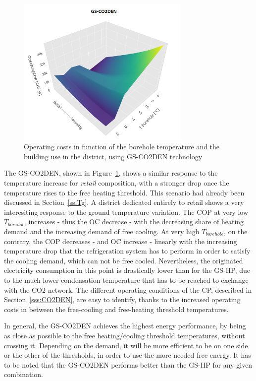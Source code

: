 \documentclass{article}
\begin{document}
\begin{figure}[htp]
	\centering
	\includegraphics[width=0.75\textwidth]{CUTg_SA_CO2_OC.png}
	\caption{Operating costs in function of the borehole temperature and the building use in the district, using GS-CO2DEN technology}
	\label{fig:CUTg_CO2_OC}
\end{figure}

The GS-CO2DEN, shown in Figure~\ref{fig:CUTg_CO2_OC}, shows a similar response to the temperature increase for \textit{retail} composition, with a stronger drop once the temperature rises to the free heating threshold. This scenario had already been discussed in Section~\ref{ss:Tg}. A district dedicated entirely to retail shows a very interesiting response to the ground temperature variation. The COP at very low $T_{borehole}$ increases - thus the OC decrease - with the decreasing share of heating demand and the increasing demand of free cooling. At very high $T_{borehole}$, on the contrary, the COP decreases - and OC increase - linearly with the increasing temperature drop that the refrigeration system has to perform in order to satisfy the cooling demand, which can not be free cooled. Nevertheless, the originated electricity consumption in this point is drastically lower than for the GS-HP, due to the much lower condensation temperature that has to be reached to exchange with the CO2 network. The different operating conditions of the CP, described in Section~\ref{sss:CO2DEN}, are easy to identify, thanks to the increased operating costs in between the free-cooling and free-heating threshold temperatures.

In general, the GS-CO2DEN achieves the highest energy performance, by being as close as possible to the free heating/cooling threshold temperatures, without crossing it. Depending on the demand, it will be more efficient to be on one side or the other of the thresholds, in order to use the more needed free energy. It has to be noted that the GS-CO2DEN performs better than the GS-HP for any given combination. \\
\end{document}
